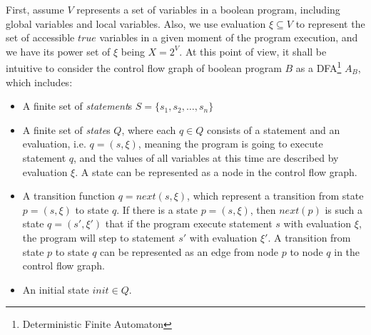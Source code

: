 First, assume $V$ represents a set of variables in a boolean program, including global variables and local variables.
Also, we use evaluation $\xi \subseteq V$ to represent the set of accessible $true$ variables in a given moment of the program execution, and we have its power set of $\xi$ being $X = 2^{V}$.
At this point of view, it shall be intuitive to consider the control flow graph of boolean program $B$ as a DFA\footnote{Deterministic Finite Automaton} $A_{B}$, which includes:
\begin{itemize}
\item A finite set of {\it statement}s $S=\{s_{1},s_{2},\dots,s_{n}\}$
\item A finite set of {\it state}s $Q$, where each $q \in Q$ consists of a statement and an evaluation, i.e. $q=(s,\xi)$, meaning the program is going to execute statement $q$, and the values of all variables at this time are described by evaluation $\xi$. A state can be represented as a node in the control flow graph.
\item A transition function $q=next(s,\xi)$, which represent a transition from state $p=(s,\xi)$ to state $q$. If there is a state $p=(s,\xi)$, then $next(p)$ is such a state $q=(s\prime,\xi\prime)$ that if the program execute statement $s$ with evaluation $\xi$, the program will step to statement $s\prime$ with evaluation $\xi\prime$. A transition from state $p$ to state $q$ can be represented as an edge from node $p$ to node $q$ in the control flow graph.
\item An initial state $init \in Q$.
\end{itemize}

